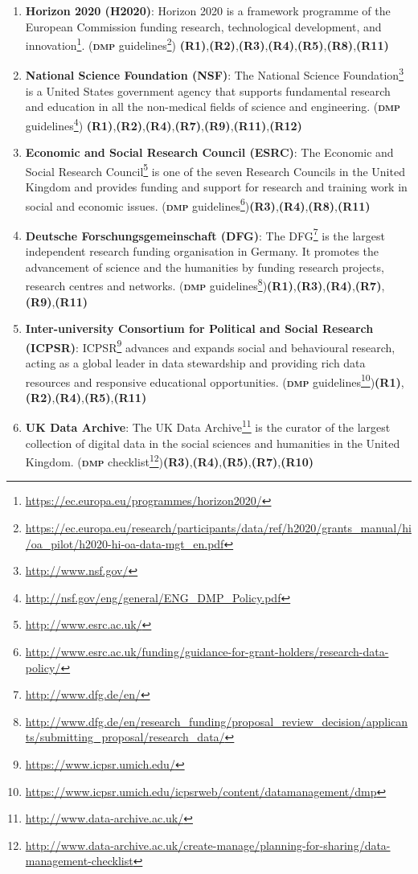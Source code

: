 \documentclass[a4paper,english,twoside,BCOR1.5cm,headsepline,DIV12,appendixprefix,final,12pt]{scrbook}
\newcommand{\dmp}{{\scshape\bfseries dmp}\xspace}
\newcommand\footnoteurl[1]{\footnote{\scriptsize\url{#1}}}
\begin{document}
\begin{enumerate}
\item \textbf{Horizon 2020 (H2020)}: Horizon 2020 is a framework programme of the European Commission funding research, technological development, and innovation\footnoteurl{https://ec.europa.eu/programmes/horizon2020/}. (\dmp guidelines\footnoteurl{https://ec.europa.eu/research/participants/data/ref/h2020/grants_manual/hi/oa_pilot/h2020-hi-oa-data-mgt_en.pdf}) \textbf{(R1)},\textbf{(R2)},\textbf{(R3)},\textbf{(R4)},\textbf{(R5)},\textbf{(R8)},\textbf{(R11)}

\item \textbf{National Science Foundation (NSF)}: The National Science Foundation\footnoteurl{http://www.nsf.gov/} is a United States government agency that supports fundamental research and education in all the non-medical fields of science and engineering. (\dmp guidelines\footnoteurl{http://nsf.gov/eng/general/ENG_DMP_Policy.pdf}) \textbf{(R1)},\textbf{(R2)},\textbf{(R4)},\textbf{(R7)},\textbf{(R9)},\textbf{(R11)},\textbf{(R12)}

\item \textbf{Economic and Social Research Council (ESRC)}: The Economic and Social Research Council\footnoteurl{http://www.esrc.ac.uk/} is one of the seven Research Councils in the United Kingdom and provides funding and support for research and training work in social and economic issues. (\dmp guidelines\footnoteurl{http://www.esrc.ac.uk/funding/guidance-for-grant-holders/research-data-policy/})\textbf{(R3)},\textbf{(R4)},\textbf{(R8)},\textbf{(R11)}

\item \textbf{Deutsche Forschungsgemeinschaft (DFG)}: The DFG\footnoteurl{http://www.dfg.de/en/} is the largest independent research funding organisation in Germany. It promotes the advancement of science and the humanities by funding research projects, research centres and networks. (\dmp guidelines\footnoteurl{http://www.dfg.de/en/research_funding/proposal_review_decision/applicants/submitting_proposal/research_data/})\textbf{(R1)},\textbf{(R3)},\textbf{(R4)},\textbf{(R7)}, \textbf{(R9)},\textbf{(R11)}

\item \textbf{Inter-university Consortium for Political and Social Research (ICPSR)}: ICPSR\footnoteurl{https://www.icpsr.umich.edu/} advances and expands social and behavioural research, acting as a global leader in data stewardship and providing rich data resources and responsive educational opportunities. (\dmp guidelines\footnoteurl{https://www.icpsr.umich.edu/icpsrweb/content/datamanagement/dmp})\textbf{(R1)},\textbf{(R2)},\textbf{(R4)},\textbf{(R5)},\textbf{(R11)}

\item \textbf{UK Data Archive}: The UK Data Archive\footnoteurl{http://www.data-archive.ac.uk/} is the curator of the largest collection of digital data in the social sciences and humanities in the United Kingdom. (\dmp checklist\footnoteurl{http://www.data-archive.ac.uk/create-manage/planning-for-sharing/data-management-checklist})\textbf{(R3)},\textbf{(R4)},\textbf{(R5)},\textbf{(R7)},\textbf{(R10)}\label{fbitem:ukda}
\end{enumerate}
\end{document}
